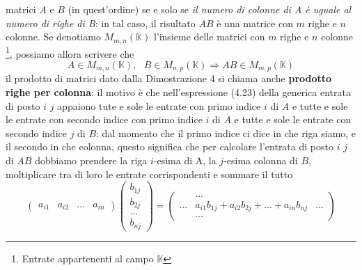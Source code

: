 matrici $A$ e $B$ (in quest'ordine) se e solo se \textit{il numero di colonne di A è uguale al
  numero di righe di B}: in tal caso, il risultato $AB$ è una matrice con $m$ righe e $n$
colonne. Se denotiamo $M_{m,n}(\mathbb{K})$ l'insieme delle matrici con $m$ righe e $n$ colonne
\footnote{Entrate appartenenti al campo $\mathbb{K}$}, possiamo allora scrivere che
\begin{equation*}
  A\in M_{m,n}(\mathbb{K}),\text{ }B\in M_{n,p}(\mathbb{K})\Rightarrow AB\in M_{m,p}(\mathbb{K})
\end{equation*}
il prodotto di matrici dato dalla Dimostrazione 4 si chiama anche \textbf{prodotto righe per
  colonna}: il motivo è che nell'espressione (4.23) della generica entrata di posto $i$ $j$
appaiono tute e sole le entrate con primo indice $i$ di $A$ e tutte e sole le entrate con
secondo indice con primo indice $i$ di $A$ e tutte e sole le entrate con secondo indice $j$ di
$B$: dal momento che il primo indice ci dice in che riga siamo, e il secondo in che colonna,
questo significa che per calcolare l'entrata di posto $i$ $j$ di $AB$ dobbiamo prendere la riga
$i$-esima di A, la $j$-esima colonna di $B$, moltiplicare tra di loro le entrate corrispondenti e
sommare il tutto
\begin{equation*}
  \begin{pmatrix}
    a_{i1} & a_{i2} &\dots & a_{in}
  \end{pmatrix}
  \begin{pmatrix}
    b_{1j}\\
    b_{2j}\\
    \dots\\
    b_{nj}
  \end{pmatrix}=
  \begin{pmatrix}
    &\dots\\
    \dots & a_{i1}b_{1j}+a_{i2}b_{2j}+\dots+a_{in}b_{nj} &\dots\\
    &\dots
  \end{pmatrix}
\end{equation*}
